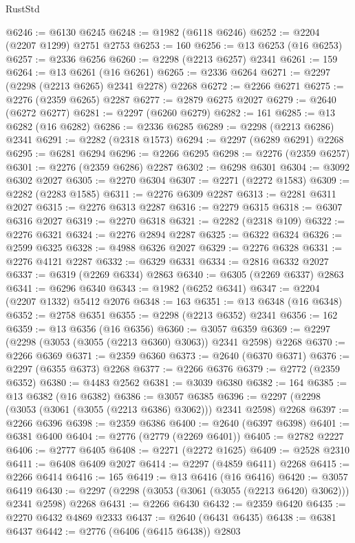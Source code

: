 \begin{lexlean}{RustStd}
\begin{coremodule}
@6246 := @6130 @6245
@6248 := @1982 (@6118 @6246)
@6252 := @2204 (@2207 @1299) @2751 @2753
@6253 := 160
@6256 := @13 @6253 (@16 @6253)
@6257 := @2336 @6256
@6260 := @2298 (@2213 @6257) @2341
@6261 := 159
@6264 := @13 @6261 (@16 @6261)
@6265 := @2336 @6264
@6271 := @2297 (@2298 (@2213 @6265) @2341 @2278) @2268
@6272 := @2266 @6271
@6275 := @2276 (@2359 @6265) @2287
@6277 := @2879 @6275 @2027
@6279 := @2640 (@6272 @6277)
@6281 := @2297 (@6260 @6279)
@6282 := 161
@6285 := @13 @6282 (@16 @6282)
@6286 := @2336 @6285
@6289 := @2298 (@2213 @6286) @2341
@6291 := @2282 (@2318 @1573)
@6294 := @2297 (@6289 @6291) @2268
@6295 := @6281 @6294
@6296 := @2266 @6295
@6298 := @2276 (@2359 @6257)
@6301 := @2276 (@2359 @6286) @2287
@6302 := @6298 @6301
@6304 := @3092 @6302 @2027
@6305 := @2270 @6304
@6307 := @2271 (@2272 @1583)
@6309 := @2282 (@2283 @1585)
@6311 := @2276 @6309 @2287
@6313 := @2281 @6311 @2027
@6315 := @2276 @6313 @2287
@6316 := @2279 @6315
@6318 := @6307 @6316 @2027
@6319 := @2270 @6318
@6321 := @2282 (@2318 @109)
@6322 := @2276 @6321
@6324 := @2276 @2894 @2287
@6325 := @6322 @6324
@6326 := @2599 @6325
@6328 := @4988 @6326 @2027
@6329 := @2276 @6328
@6331 := @2276 @4121 @2287
@6332 := @6329 @6331
@6334 := @2816 @6332 @2027
@6337 := @6319 (@2269 @6334) @2863
@6340 := @6305 (@2269 @6337) @2863
@6341 := @6296 @6340
@6343 := @1982 (@6252 @6341)
@6347 := @2204 (@2207 @1332) @5412 @2076
@6348 := 163
@6351 := @13 @6348 (@16 @6348)
@6352 := @2758 @6351
@6355 := @2298 (@2213 @6352) @2341
@6356 := 162
@6359 := @13 @6356 (@16 @6356)
@6360 := @3057 @6359
@6369 := @2297 (@2298 (@3053 (@3055 (@2213 @6360) @3063)) @2341 @2598) @2268
@6370 := @2266 @6369
@6371 := @2359 @6360
@6373 := @2640 (@6370 @6371)
@6376 := @2297 (@6355 @6373) @2268
@6377 := @2266 @6376
@6379 := @2772 (@2359 @6352)
@6380 := @4483 @2562
@6381 := @3039 @6380
@6382 := 164
@6385 := @13 @6382 (@16 @6382)
@6386 := @3057 @6385
@6396 := @2297 (@2298 (@3053 (@3061 (@3055 (@2213 @6386) @3062))) @2341 @2598) @2268
@6397 := @2266 @6396
@6398 := @2359 @6386
@6400 := @2640 (@6397 @6398)
@6401 := @6381 @6400
@6404 := @2776 (@2779 (@2269 @6401))
@6405 := @2782 @2227
@6406 := @2777 @6405
@6408 := @2271 (@2272 @1625)
@6409 := @2528 @2310
@6411 := @6408 @6409 @2027
@6414 := @2297 (@4859 @6411) @2268
@6415 := @2266 @6414
@6416 := 165
@6419 := @13 @6416 (@16 @6416)
@6420 := @3057 @6419
@6430 := @2297 (@2298 (@3053 (@3061 (@3055 (@2213 @6420) @3062))) @2341 @2598) @2268
@6431 := @2266 @6430
@6432 := @2359 @6420
@6435 := @2270 @6432 @4869 @2333
@6437 := @2640 (@6431 @6435)
@6438 := @6381 @6437
@6442 := @2776 (@6406 (@6415 @6438)) @2803

\end{coremodule}
\end{lexlean}
